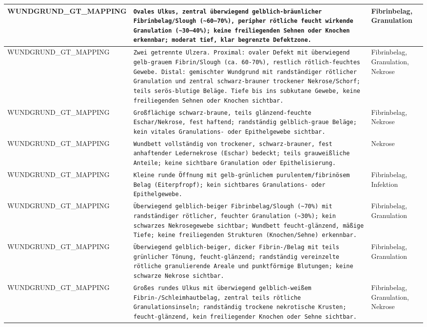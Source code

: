 \begin{longtable}{|p{3.5cm}|p{5cm}|p{6.5cm}|}
WUNDGRUND\_GT\_MAPPING & \texttt{Ovales Ulkus, zentral überwiegend gelblich-bräunlicher Fibrinbelag/Slough (\textasciitilde{}60–70\%), peripher rötliche feucht wirkende Granulation (\textasciitilde{}30–40\%); keine freiliegenden Sehnen oder Knochen erkennbar; moderat tief, klar begrenzte Defektzone.} & Fibrinbelag, Granulation \\ \hline
WUNDGRUND\_GT\_MAPPING & \texttt{Zwei getrennte Ulzera. Proximal: ovaler Defekt mit überwiegend gelb-grauem Fibrin/Slough (ca. 60-70\%), restlich rötlich-feuchtes Gewebe. Distal: gemischter Wundgrund mit randständiger rötlicher Granulation und zentral schwarz-brauner trockener Nekrose/Schorf; teils serös-blutige Beläge. Tiefe bis ins subkutane Gewebe, keine freiliegenden Sehnen oder Knochen sichtbar.} & Fibrinbelag, Granulation, Nekrose \\ \hline
WUNDGRUND\_GT\_MAPPING & \texttt{Großflächige schwarz-braune, teils glänzend-feuchte Eschar/Nekrose, fest haftend; randständig gelblich-graue Beläge; kein vitales Granulations- oder Epithelgewebe sichtbar.} & Fibrinbelag, Nekrose \\ \hline
WUNDGRUND\_GT\_MAPPING & \texttt{Wundbett vollständig von trockener, schwarz-brauner, fest anhaftender Ledernekrose (Eschar) bedeckt; teils grauweißliche Anteile; keine sichtbare Granulation oder Epithelisierung.} & Nekrose \\ \hline
WUNDGRUND\_GT\_MAPPING & \texttt{Kleine runde Öffnung mit gelb-grünlichem purulentem/fibrinösem Belag (Eiterpfropf); kein sichtbares Granulations- oder Epithelgewebe.} & Fibrinbelag, Infektion \\ \hline
WUNDGRUND\_GT\_MAPPING & \texttt{Überwiegend gelblich-beiger Fibrinbelag/Slough (\textasciitilde{}70\%) mit randständiger rötlicher, feuchter Granulation (\textasciitilde{}30\%); kein schwarzes Nekrosegewebe sichtbar; Wundbett feucht-glänzend, mäßige Tiefe; keine freiliegenden Strukturen (Knochen/Sehne) erkennbar.} & Fibrinbelag, Granulation \\ \hline
WUNDGRUND\_GT\_MAPPING & \texttt{Überwiegend gelblich-beiger, dicker Fibrin-/Belag mit teils grünlicher Tönung, feucht-glänzend; randständig vereinzelte rötliche granulierende Areale und punktförmige Blutungen; keine schwarze Nekrose sichtbar.} & Fibrinbelag, Granulation \\ \hline
WUNDGRUND\_GT\_MAPPING & \texttt{Großes rundes Ulkus mit überwiegend gelblich-weißem Fibrin-/Schleimhautbelag, zentral teils rötliche Granulationsinseln; randständig trockene nekrotische Krusten; feucht-glänzend, kein freiliegender Knochen oder Sehne sichtbar.} & Fibrinbelag, Granulation, Nekrose \\ \hline

\end{longtable}
